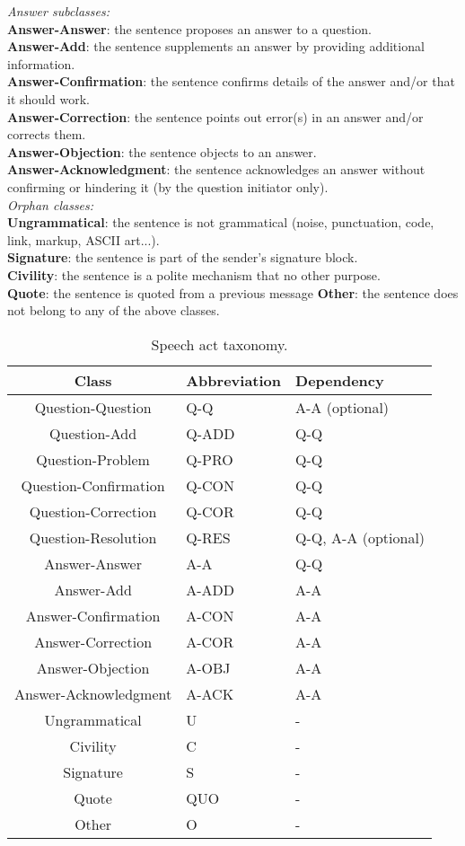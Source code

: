 \documentclass[11pt]{article}
\begin{document}
\textit{Answer subclasses:} \\
\textbf{Answer-Answer}: the sentence proposes an answer to a question. \\
\textbf{Answer-Add}: the sentence supplements an answer by providing additional information. \\
\textbf{Answer-Confirmation}: the sentence confirms details of the answer and/or that it should work. \\
\textbf{Answer-Correction}: the sentence points out error(s) in an answer and/or corrects them. \\
\textbf{Answer-Objection}: the sentence objects to an answer. \\
\textbf{Answer-Acknowledgment}: the sentence acknowledges an answer without confirming or hindering it (by the question initiator only). \\

\textit{Orphan classes:} \\
\textbf{Ungrammatical}: the sentence is not grammatical (noise, punctuation, code, link, markup, ASCII art...). \\
\textbf{Signature}: the sentence is part of the sender's signature block. \\
\textbf{Civility}: the sentence is a polite mechanism that no other purpose. \\
\textbf{Quote}: the sentence is quoted from a previous message
\textbf{Other}: the sentence does not belong to any of the above classes. \\

\begin{table}[H]
	\begin{tabularx}{\textwidth}{c Y Y}
		Class & Abbreviation & Dependency \\
		\toprule
		Question-Question & Q-Q & A-A (optional) \\
		Question-Add & Q-ADD & Q-Q \\
		Question-Problem & Q-PRO & Q-Q \\
		Question-Confirmation & Q-CON & Q-Q \\
		Question-Correction & Q-COR & Q-Q \\
		Question-Resolution & Q-RES & Q-Q, A-A (optional) \\
		\midrule
		Answer-Answer & A-A & Q-Q \\
		Answer-Add & A-ADD & A-A \\
		Answer-Confirmation & A-CON & A-A \\
		Answer-Correction & A-COR & A-A \\
		Answer-Objection & A-OBJ & A-A \\
		Answer-Acknowledgment & A-ACK & A-A \\
		\midrule
		Ungrammatical & U & - \\
		Civility & C & - \\
		Signature & S & - \\
		Quote & QUO & - \\
		Other & O & - \\
		\bottomrule
	\end{tabularx}
	\caption{Speech act taxonomy.}
	\label{fig:taxonomy}
\end{table}



\end{document}
